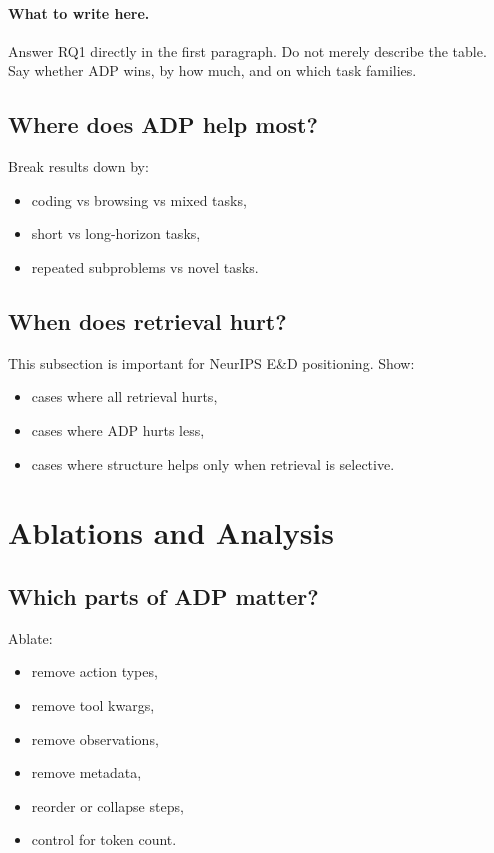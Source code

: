 \documentclass{article}
\newcommand{\ADP}{\textsc{ADP}}
\begin{document}
\paragraph{What to write here.}
Answer RQ1 directly in the first paragraph.
Do not merely describe the table.
Say whether \ADP{} wins, by how much, and on which task families.

\subsection{Where does \ADP{} help most?}
Break results down by:
\begin{itemize}[leftmargin=*,itemsep=2pt,topsep=2pt]
    \item coding vs browsing vs mixed tasks,
    \item short vs long-horizon tasks,
    \item repeated subproblems vs novel tasks.
\end{itemize}

\subsection{When does retrieval hurt?}
This subsection is important for NeurIPS E\&D positioning.
Show:
\begin{itemize}[leftmargin=*,itemsep=2pt,topsep=2pt]
    \item cases where all retrieval hurts,
    \item cases where \ADP{} hurts less,
    \item cases where structure helps only when retrieval is selective.
\end{itemize}

\section{Ablations and Analysis}

\subsection{Which parts of \ADP{} matter?}
Ablate:
\begin{itemize}[leftmargin=*,itemsep=2pt,topsep=2pt]
    \item remove action types,
    \item remove tool kwargs,
    \item remove observations,
    \item remove metadata,
    \item reorder or collapse steps,
    \item control for token count.
\end{itemize}
\end{document}
